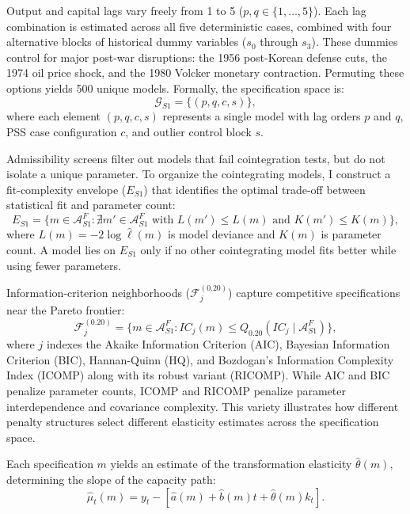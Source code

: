 Output and capital lags vary freely from 1 to 5 ($p, q \in \{1, \dots, 5\}$). Each lag combination is estimated across all five deterministic cases, combined with four alternative blocks of historical dummy variables ($s_0$ through $s_3$). These dummies control for major post-war disruptions: the 1956 post-Korean defense cuts, the 1974 oil price shock, and the 1980 Volcker monetary contraction. Permuting these options yields 500 unique models. Formally, the specification space is:
\begin{equation}
\mathcal{G}_{S1} = \{(p,q,c,s)\},
\label{eq:G_S1}
\end{equation}
where each element $(p, q, c, s)$ represents a single model with lag orders $p$ and $q$, PSS case configuration $c$, and outlier control block $s$.

Admissibility screens filter out models that fail cointegration tests, but do not isolate a unique parameter. To organize the cointegrating models, I construct a fit-complexity envelope ($E_{S1}$) that identifies the optimal trade-off between statistical fit and parameter count:
\begin{equation}
E_{S1} = \{ m \in \mathcal{A}^{F}_{S1} : \nexists m' \in \mathcal{A}^{F}_{S1} \text{ with } L(m') \leq L(m) \text{ and } K(m') \leq K(m) \},
\label{eq:E_S1}
\end{equation}
where $L(m) = -2\log\hat{\ell}(m)$ is model deviance and $K(m)$ is parameter count. A model lies on $E_{S1}$ only if no other cointegrating model fits better while using fewer parameters.

Information-criterion neighborhoods ($\mathcal{F}^{(0.20)}_j$) capture competitive specifications near the Pareto frontier:
\begin{equation}
\mathcal{F}^{(0.20)}_j = \{ m \in \mathcal{A}^{F}_{S1} : IC_j(m) \leq Q_{0.20}(IC_j \mid \mathcal{A}^{F}_{S1}) \},
\label{eq:F_j}
\end{equation}
where $j$ indexes the Akaike Information Criterion (AIC), Bayesian Information Criterion (BIC), Hannan-Quinn (HQ), and Bozdogan's Information Complexity Index (ICOMP) along with its robust variant (RICOMP). While AIC and BIC penalize parameter counts, ICOMP and RICOMP penalize parameter interdependence and covariance complexity. This variety illustrates how different penalty structures select different elasticity estimates across the specification space.

Each specification $m$ yields an estimate of the transformation elasticity $\hat{\theta}(m)$, determining the slope of the capacity path:
\begin{equation}
\hat{\mu}_t(m) = y_t - [\hat{a}(m) + \hat{b}(m)t + \hat{\theta}(m)k_t].
\label{eq:mu_hat_m}
\end{equation}

